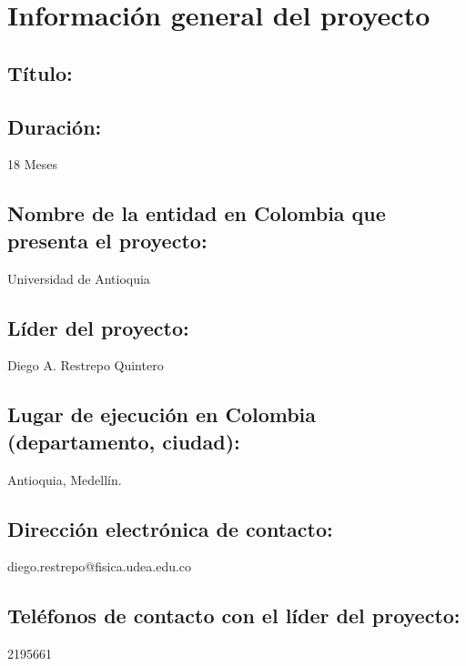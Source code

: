 
\section{Información general del proyecto}
\subsection{Título:}
\subsection{Duración: }
18 Meses
\subsection{Nombre de la entidad en Colombia que presenta el proyecto:}
Universidad de Antioquia
\subsection{Líder del proyecto: }
Diego A. Restrepo Quintero
\subsection{Lugar de ejecución en Colombia (departamento, ciudad): }
Antioquia, Medellín.
\subsection{Dirección electrónica de contacto:}
diego.restrepo@fisica.udea.edu.co
\subsection{Teléfonos de contacto con el líder del proyecto: }
2195661


